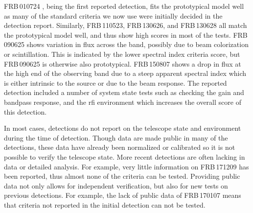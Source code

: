 \documentclass[a4paper,fleqn,usenatbib]{mnras}
\begin{document}
FRB\,010724 \citep{2007Sci...318..777L}, being the first reported detection, fits
the prototypical model well as many of the standard criteria we now use were
initially decided in the detection report.  Similarly, FRB\,110523, FRB\,130626, and
FRB\,130628 all match the prototypical model well, and thus show high scores in
most of the tests. FRB\,090625 shows variation in flux across the band, possibly
due to beam colorization or scintillation.  This is indicated by the lower
spectral index criteria score, but FRB\,090625 is otherwise also prototypical.
FRB\,150807 shows a drop in flux at the high end of the observing band due to a
steep apparent spectral index which is either intrinsic to the source or due to
the beam response. The reported detection included a number of system state
tests such as checking the gain and bandpass response, and the \gls{rfi}
environment which increases the overall score of this detection.

In most cases, detections do not report on the telescope state and environment
during the time of detection. Though data are made public in many of the
detections, these data have already been normalized or calibrated so it is not
possible to verify the telescope state. More recent detections are often lacking
in data or detailed analysis. For example, very little information on
FRB\,171209 has been reported, thus almost none of the criteria can be tested.
Providing public data not only allows for independent verification, but also for
new tests on previous detections. For example, the lack of public data of
FRB\,170107 means that criteria not reported in the initial detection can not be
tested.
\end{document}
